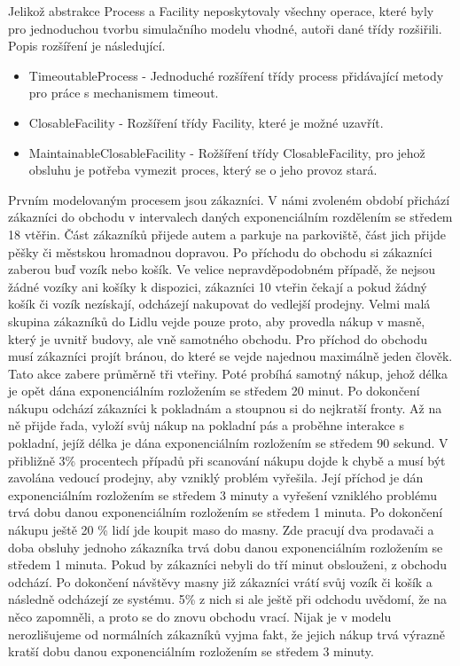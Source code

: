 \documentclass[12pt,a4paper,titlepage]{article}
\begin{document}
Jelikož abstrakce Process a Facility neposkytovaly všechny operace, které byly pro jednoduchou tvorbu simulačního modelu vhodné, autoři dané třídy rozšiřili. Popis rozšíření je následující. 

\begin{itemize}
\item TimeoutableProcess  - Jednoduché rozšíření třídy process přidávající metody pro práce s mechanismem timeout.
\item ClosableFacility -  Rozšíření třídy Facility, které je možné uzavřít. 
\item MaintainableClosableFacility - Rožšíření třídy ClosableFacility, pro jehož obsluhu je potřeba vymezit proces, který se o jeho provoz stará. 
\end{itemize}


Prvním modelovaným procesem jsou zákazníci. V námi zvoleném období přichází zákazníci do obchodu v intervalech daných exponenciálním rozdělením se středem 18 vtěřin. Část zákazníků přijede autem a parkuje na parkoviště, část jich přijde pěšky či městskou hromadnou dopravou. Po příchodu do obchodu si zákazníci zaberou buď vozík nebo košík. Ve velice nepravděpodobném případě, že nejsou žádné vozíky ani košíky k dispozici, zákazníci 10 vteřin čekají a pokud žádný košík či vozík nezískají, odcházejí nakupovat do vedlejší prodejny. Velmi malá skupina zákazníků do Lidlu vejde pouze proto, aby provedla nákup v masně, který je uvnitř budovy, ale vně samotného obchodu. Pro příchod do obchodu musí zákazníci projít bránou, do které se vejde najednou maximálně jeden člověk. Tato akce zabere průměrně tři vteřiny. Poté probíhá samotný nákup, jehož délka je opět dána exponenciálním rozložením se středem 20 minut. Po dokončení nákupu odchází zákazníci k pokladnám a stoupnou si do nejkratší fronty. Až na ně přijde řada, vyloží svůj nákup na pokladní pás a proběhne interakce s pokladní, jejíž délka je dána exponenciálním rozložením se středem 90 sekund. V přibližně 3\% procentech případů při scanování nákupu dojde k chybě a musí být zavolána vedoucí prodejny, aby vzniklý problém vyřešila. Její příchod je dán exponenciálním rozložením se středem 3 minuty a vyřešení vzniklého problému trvá dobu danou exponenciálním rozložením se středem 1 minuta. Po dokončení nákupu ještě 20 \% lidí jde koupit maso do masny. Zde pracují dva prodavači a doba obsluhy jednoho zákazníka trvá dobu danou exponenciálním rozložením se středem 1 minuta. Pokud by zákazníci nebyli do tří minut obslouženi, z obchodu odchází. Po dokončení návštěvy masny již zákazníci vrátí svůj vozík či košík a následně odcházejí ze systému. 5\% z nich si ale ještě při odchodu uvědomí, že na něco zapomněli, a proto se do znovu obchodu vrací. Nijak je v modelu nerozlišujeme od normálních zákazníků vyjma fakt, že jejich nákup trvá výrazně kratší dobu danou exponenciálním rozložením se středem 3 minuty.
\end{document}
